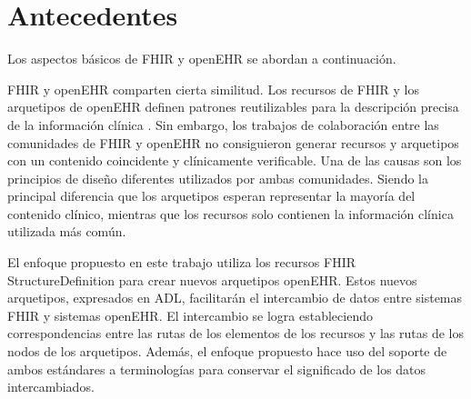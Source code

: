 \section{Antecedentes}

Los aspectos básicos de FHIR y openEHR se abordan a continuación.





FHIR y openEHR comparten cierta similitud. Los recursos de FHIR y los arquetipos de openEHR definen patrones reutilizables para la descripción precisa de la información clínica \cite{Bosca15}. Sin embargo, los trabajos de colaboración entre las comunidades de FHIR y openEHR \cite{Collaboration} no consiguieron generar recursos y arquetipos con un contenido coincidente y clínicamente verificable. Una de las causas son los principios de diseño diferentes utilizados por ambas comunidades. Siendo la principal diferencia que los arquetipos esperan representar la mayoría del contenido clínico, mientras que los recursos solo contienen la información clínica utilizada más común.

El enfoque propuesto en este trabajo utiliza los recursos FHIR StructureDefinition para crear nuevos arquetipos openEHR. Estos nuevos arquetipos, expresados en ADL, facilitarán el intercambio de datos entre sistemas FHIR y sistemas openEHR. El intercambio se logra estableciendo correspondencias entre las rutas de los elementos de los recursos y las rutas de los nodos de los arquetipos. Además, el enfoque propuesto hace uso del soporte de ambos estándares a terminologías para conservar el significado de los datos intercambiados.
